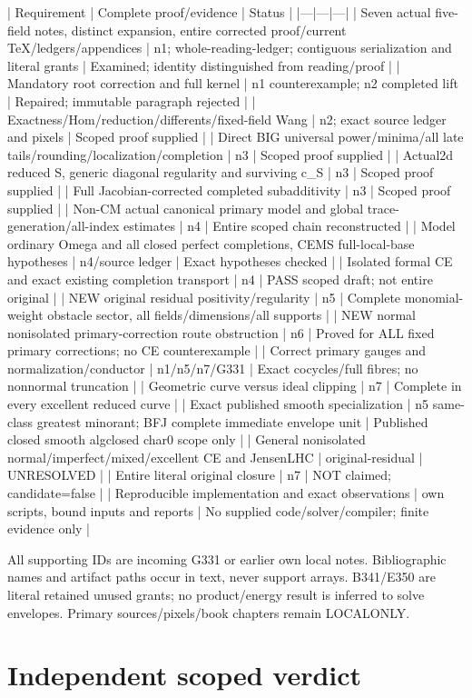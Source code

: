 \documentclass[11pt]{article}
\begin{document}
| Requirement | Complete proof/evidence | Status |
|---|---|---|
| Seven actual five-field notes, distinct expansion, entire corrected proof/current TeX/ledgers/appendices | n1; whole-reading-ledger; contiguous serialization and literal grants | Examined; identity distinguished from reading/proof |
| Mandatory root correction and full kernel | n1 counterexample; n2 completed lift | Repaired; immutable paragraph rejected |
| Exactness/Hom/reduction/differents/fixed-field Wang | n2; exact source ledger and pixels | Scoped proof supplied |
| Direct BIG universal power/minima/all late tails/rounding/localization/completion | n3 | Scoped proof supplied |
| Actual2d reduced S, generic diagonal regularity and surviving c\_S | n3 | Scoped proof supplied |
| Full Jacobian-corrected completed subadditivity | n3 | Scoped proof supplied |
| Non-CM actual canonical primary model and global trace-generation/all-index estimates | n4 | Entire scoped chain reconstructed |
| Model ordinary Omega and all closed perfect completions, CEMS full-local-base hypotheses | n4/source ledger | Exact hypotheses checked |
| Isolated formal CE and exact existing completion transport | n4 | PASS scoped draft; not entire original |
| NEW original residual positivity/regularity | n5 | Complete monomial-weight obstacle sector, all fields/dimensions/all supports |
| NEW normal nonisolated primary-correction route obstruction | n6 | Proved for ALL fixed primary corrections; no CE counterexample |
| Correct primary gauges and normalization/conductor | n1/n5/n7/G331 | Exact cocycles/full fibres; no nonnormal truncation |
| Geometric curve versus ideal clipping | n7 | Complete in every excellent reduced curve |
| Exact published smooth specialization | n5 same-class greatest minorant; BFJ complete immediate envelope unit | Published closed smooth algclosed char0 scope only |
| General nonisolated normal/imperfect/mixed/excellent CE and JensenLHC | original-residual | UNRESOLVED |
| Entire literal original closure | n7 | NOT claimed; candidate=false |
| Reproducible implementation and exact observations | own scripts, bound inputs and reports | No supplied code/solver/compiler; finite evidence only |

All supporting IDs are incoming G331 or earlier own local notes. Bibliographic names and artifact paths occur in text, never support arrays. B341/E350 are literal retained unused grants; no product/energy result is inferred to solve envelopes. Primary sources/pixels/book chapters remain LOCALONLY.
\section{Independent scoped verdict}
\end{document}
